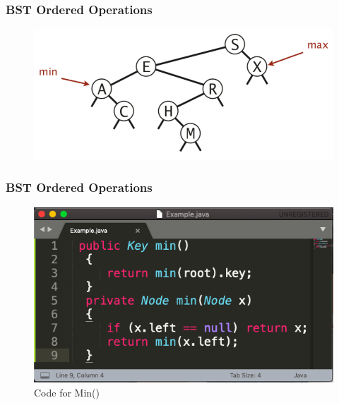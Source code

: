 \documentclass[11pt]{beamer}
\begin{document}
    \begin{frame}[fragile]
  	\frametitle{BST Ordered Operations}
  	\begin{figure}
  		\centering
  		\includegraphics[width=0.8\linewidth]{"Screenshot 2020-11-03 at 10.59.38 PM"}
  		\caption{}
  		\label{fig:screenshot-2020-11-03-at-10}
  	\end{figure}	
  \end{frame}
      \begin{frame}[fragile]
     	\frametitle{BST Ordered Operations}
        \begin{figure}
        	\centering
        	\includegraphics[width=0.9\linewidth]{"Screenshot 2020-11-03 at 10.39.52 PM"}
        	\caption{Code for Min()}
        	\label{fig:screenshot-2020-11-03-at-10}
        \end{figure}
        
     \end{frame}
      
\end{document}
